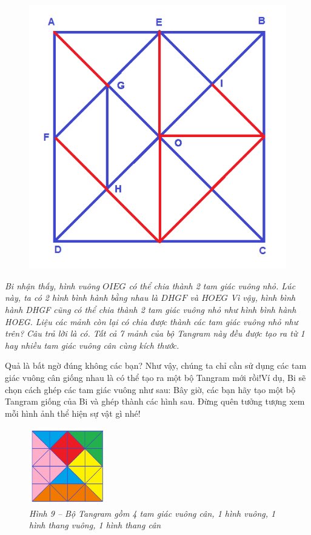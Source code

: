 \begin{figure}[H]
	\includegraphics[scale=0.25]{image12}
	\end{figure}
	\textit{Bi nhận thấy, hình vuông $OIEG$ có thể chia thành 2 tam giác vuông nhỏ. Lúc này, ta có 2 hình  bình hành bằng nhau là $DHGF$ và $HOEG$}
	\vskip 0.1cm
	\textit{Vì vậy, hình bình hành \textit{DHGF} cũng có thể chia thành 2 tam giác vuông nhỏ như hình bình hành \textit{HOEG}.
	\vskip 0.1cm
	Liệu các mảnh còn lại có chia được thành các tam giác vuông nhỏ như trên?}
	\vskip 0.1cm
	\textit{Câu trả lời là có.
	\vskip 0.1cm
	Tất cả 7 mảnh của bộ Tangram này đều được tạo ra từ 1 hay nhiều tam giác vuông cân cùng kích thước.}
	\begin{multicols}{2}
	Quả là bất ngờ đúng không các bạn? Như vậy, chúng ta chỉ cần sử dụng các tam giác vuông cân giống nhau là có thể tạo ra một bộ Tangram mới rồi!Ví dụ, Bi sẽ chọn cách ghép các tam giác vuông như sau:
	\vskip 0.1cm
		Bây giờ, các bạn hãy tạo một bộ Tangram giống của Bi và ghép thành các hình sau. Đừng quên tưởng tượng xem mỗi hình ảnh thể hiện sự vật gì nhé!
		\begin{figure}[H]
			\vspace*{-15pt}
			\centering
			\captionsetup{labelformat=empty}
			\includegraphics[width=0.3\textwidth]{image13}
			\caption{\small \it Hình 9 -- Bộ Tangram gồm 4 tam giác vuông cân, 1 hình vuông, 1 hình thang vuông, 1 hình thang cân}
			\vspace*{-5pt}
		\end{figure}
	\end{multicols}

